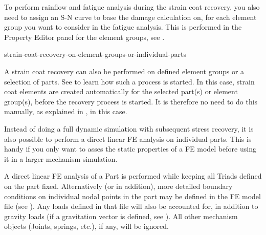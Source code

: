 To perform rainflow and fatigue analysis during the strain coat recovery,
you also need to assign an S-N curve to base the damage calculation on,
for each element group you want to consider in the fatigue analysis.
This is performed in the Property Editor panel for the element groups,
see .





           {strain-coat-recovery-on-element-groups-or-individual-parts}

A strain coat recovery can also be performed on defined element groups
or a selection of parts.
See 
to learn how such a process is started.
In this case, strain coat elements are created automatically for the
selected part(s) or element group(s), before the recovery process is started.
It is therefore no need to do this manually, as explained in
, in this case.



Instead of doing a full dynamic simulation with subsequent stress recovery,
it is also possible to perform a direct linear FE analysis on individual parts.
This is handy if you only want to asses the static properties of a FE model
before using it in a larger mechanism simulation.

A direct linear FE analysis of a Part is performed while keeping all Triads
defined on the part fixed. Alternatively (or in addition), more detailed
boundary conditions on individual nodal points in the part may be defined in
the FE model file (see ).
Any loads defined in that file will also be accounted for,
in addition to gravity loads (if a gravitation vector is defined,
see ).
All other mechanism objects (Joints, springs, etc.), if any, will be ignored.

